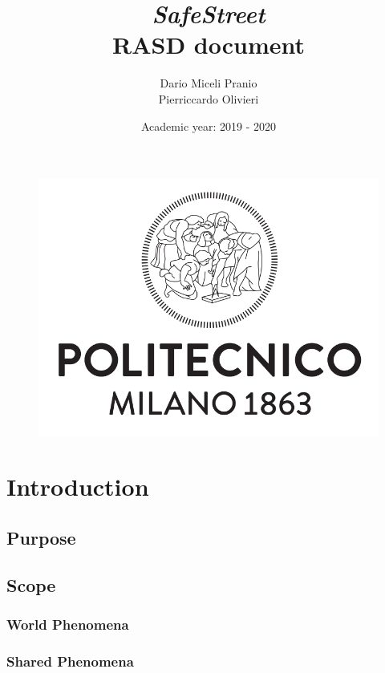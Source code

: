\documentclass{article}
\title{
    \textbf{\textit{SafeStreet}} \\
    \textbf{RASD document}}
\date{Academic year: 2019 - 2020}
\author{
    Dario Miceli Pranio \\
    Pierriccardo Olivieri
}
\begin{document}

\maketitle

\begin{figure}[h!]
    \centering
    \includegraphics[scale=0.5]{img/logo.png}
\end{figure}

\newpage
{}
\tableofcontents

\newpage
\section{Introduction}

\subsection{Purpose}
\subsubsection{}

\subsection{Scope}
\subsubsection{World Phenomena}
\subsubsection{Shared Phenomena}
\end{document}
